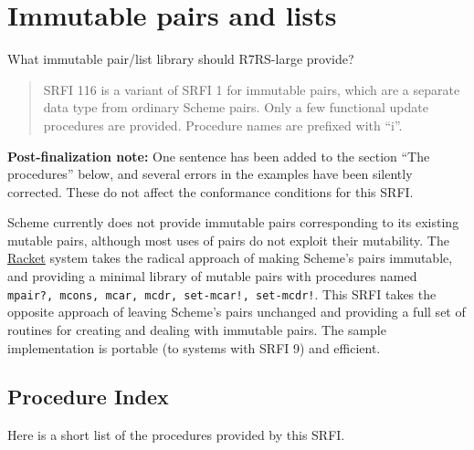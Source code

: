 \section{Immutable pairs and lists}
 What immutable pair/list library should R7RS-large provide?

\begin{quote}
SRFI 116 is a variant of SRFI 1 for immutable pairs, which are a
separate data type from ordinary Scheme pairs. Only a few functional
update procedures are provided. Procedure names are prefixed with ``i''.
\end{quote}


\textbf{Post-finalization note:} One sentence has been added to the
section ``The procedures'' below, and several errors in the examples
have been silently corrected. These do not affect the conformance
conditions for this SRFI.


Scheme currently does not provide immutable pairs corresponding to its
existing mutable pairs, although most uses of pairs do not exploit their
mutability. The \href{http://www.racket-lang.org}{Racket} system takes
the radical approach of making Scheme's pairs immutable, and providing a
minimal library of mutable pairs with procedures named
\texttt{mpair?,\ mcons,\ mcar,\ mcdr,\ set-mcar!,\ set-mcdr!}. This SRFI
takes the opposite approach of leaving Scheme's pairs unchanged and
providing a full set of routines for creating and dealing with immutable
pairs. The sample implementation is portable (to systems with SRFI 9)
and efficient.


\subsection{{Procedure Index}}\label{procedure-index}

Here is a short list of the procedures provided by this SRFI.

